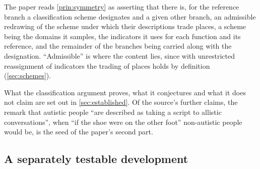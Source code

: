 The paper reads \autoref{prin:symmetry} as asserting that there is, for the reference branch a classification scheme designates and a given other branch, an admissible redrawing of the scheme under which their descriptions trade places, a scheme being the domains it samples, the indicators it uses for each function and its reference, and the remainder of the branches being carried along with the designation. ``Admissible'' is where the content lies, since with unrestricted reassignment of indicators the trading of places holds by definition (\autoref{sec:schemes}).

What the classification argument proves, what it conjectures and what it does not claim are set out in \autoref{sec:established}. Of the source's further claims, the remark that autistic people ``are described as taking a script to allistic conversations'', when ``if the shoe were on the other foot'' non-autistic people would be, is the seed of the paper's second part.

\subsection{A separately testable development}

